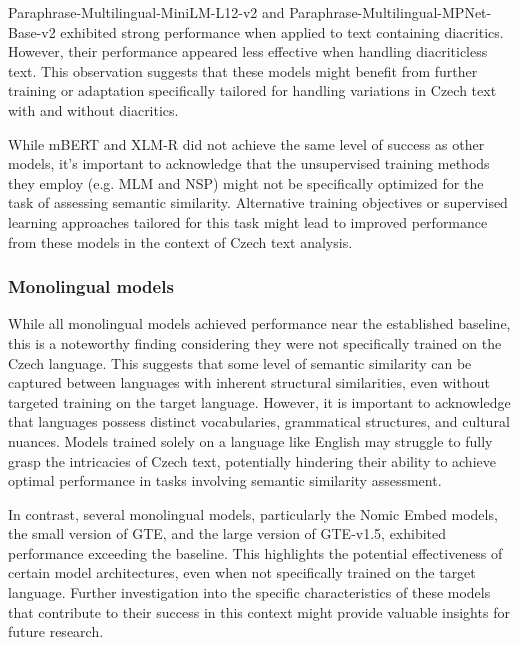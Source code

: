Paraphrase-Multilingual-MiniLM-L12-v2 and Paraphrase-Multilingual-MPNet-Base-v2 exhibited strong performance when applied to text containing diacritics.
However, their performance appeared less effective when handling diacriticless text.
This observation suggests that these models might benefit from further training or adaptation specifically tailored for handling variations in Czech text with and without diacritics.

While mBERT and XLM-R did not achieve the same level of success as other models, it's important to acknowledge that the unsupervised training methods they employ (e.g. \ac{MLM} and \ac{NSP}) might not be specifically optimized for the task of assessing semantic similarity.
Alternative training objectives or supervised learning approaches tailored for this task might lead to improved performance from these models in the context of Czech text analysis.

\subsubsection{Monolingual models}

While all monolingual models achieved performance near the established baseline, this is a noteworthy finding considering they were not specifically trained on the Czech language.
This suggests that some level of semantic similarity can be captured between languages with inherent structural similarities, even without targeted training on the target language.
However, it is important to acknowledge that languages possess distinct vocabularies, grammatical structures, and cultural nuances.
Models trained solely on a language like English may struggle to fully grasp the intricacies of Czech text, potentially hindering their ability to achieve optimal performance in tasks involving semantic similarity assessment.

In contrast, several monolingual models, particularly the Nomic Embed models, the small version of GTE, and the large version of GTE-v1.5, exhibited performance exceeding the baseline.
This highlights the potential effectiveness of certain model architectures, even when not specifically trained on the target language.
Further investigation into the specific characteristics of these models that contribute to their success in this context might provide valuable insights for future research.
\FloatBarrier



\FloatBarrier

